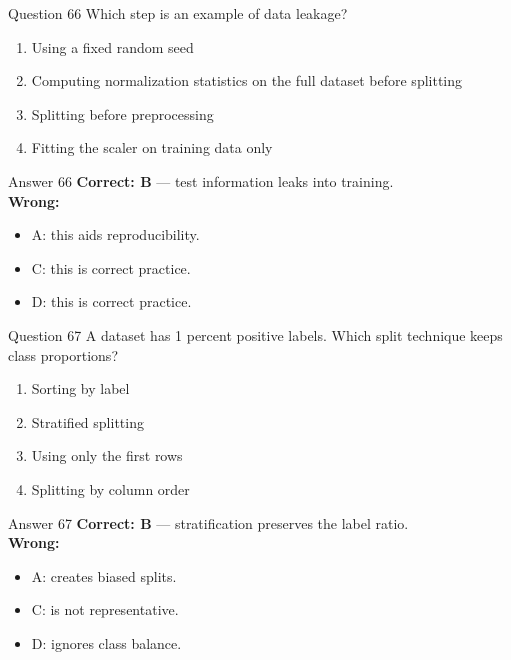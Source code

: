 \documentclass[aspectratio=169,11pt]{beamer}
\begin{document}
	\begin{frame}{Question 66}
		Which step is an example of data leakage?
		\begin{enumerate}[label=\Alph*.]
			\item Using a fixed random seed
			\item Computing normalization statistics on the full dataset before splitting
			\item Splitting before preprocessing
			\item Fitting the scaler on training data only
		\end{enumerate}
	\end{frame}
	\begin{frame}{Answer 66}
		\textbf{Correct: B} --- test information leaks into training.\\
		\vspace{0.5em}
		\textbf{Wrong:}
		\begin{itemize}
			\item A: this aids reproducibility.
			\item C: this is correct practice.
			\item D: this is correct practice.
		\end{itemize}
	\end{frame}
	
	\begin{frame}{Question 67}
		A dataset has 1 percent positive labels. Which split technique keeps class proportions?
		\begin{enumerate}[label=\Alph*.]
			\item Sorting by label
			\item Stratified splitting
			\item Using only the first rows
			\item Splitting by column order
		\end{enumerate}
	\end{frame}
	\begin{frame}{Answer 67}
		\textbf{Correct: B} --- stratification preserves the label ratio.\\
		\vspace{0.5em}
		\textbf{Wrong:}
		\begin{itemize}
			\item A: creates biased splits.
			\item C: is not representative.
			\item D: ignores class balance.
		\end{itemize}
	\end{frame}
	
\end{document}
